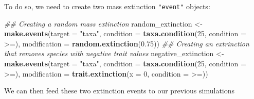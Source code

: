 \documentclass[
]{book}
\newenvironment{Shaded}{\begin{snugshade}}{\end{snugshade}}
\newcommand{\CommentTok}[1]{\textcolor[rgb]{0.56,0.35,0.01}{\textit{#1}}}
\newcommand{\DataTypeTok}[1]{\textcolor[rgb]{0.13,0.29,0.53}{#1}}
\newcommand{\DecValTok}[1]{\textcolor[rgb]{0.00,0.00,0.81}{#1}}
\newcommand{\FloatTok}[1]{\textcolor[rgb]{0.00,0.00,0.81}{#1}}
\newcommand{\KeywordTok}[1]{\textcolor[rgb]{0.13,0.29,0.53}{\textbf{#1}}}
\newcommand{\NormalTok}[1]{#1}
\newcommand{\StringTok}[1]{\textcolor[rgb]{0.31,0.60,0.02}{#1}}
\begin{document}
To do so, we need to create two mass extinction \texttt{"event"} objects:

\begin{Shaded}
\begin{Highlighting}[]
\CommentTok{\#\# Creating a random mass extinction}
\NormalTok{random\_extinction \textless{}{-}}\StringTok{ }\KeywordTok{make.events}\NormalTok{(}\DataTypeTok{target =} \StringTok{"taxa"}\NormalTok{,}
                                 \DataTypeTok{condition =} \KeywordTok{taxa.condition}\NormalTok{(}\DecValTok{25}\NormalTok{, }\DataTypeTok{condition =} \StringTok{\textasciigrave{}}\DataTypeTok{\textgreater{}=}\StringTok{\textasciigrave{}}\NormalTok{),}
                                 \DataTypeTok{modification =} \KeywordTok{random.extinction}\NormalTok{(}\FloatTok{0.75}\NormalTok{))}
\CommentTok{\#\# Creating an extrinction that removes species with negative trait values}
\NormalTok{negative\_extinction \textless{}{-}}\StringTok{ }\KeywordTok{make.events}\NormalTok{(}\DataTypeTok{target =} \StringTok{"taxa"}\NormalTok{,}
                                   \DataTypeTok{condition =} \KeywordTok{taxa.condition}\NormalTok{(}\DecValTok{25}\NormalTok{, }\DataTypeTok{condition =} \StringTok{\textasciigrave{}}\DataTypeTok{\textgreater{}=}\StringTok{\textasciigrave{}}\NormalTok{),}
                                   \DataTypeTok{modification =} \KeywordTok{trait.extinction}\NormalTok{(}\DataTypeTok{x =} \DecValTok{0}\NormalTok{, }\DataTypeTok{condition =} \StringTok{\textasciigrave{}}\DataTypeTok{\textgreater{}=}\StringTok{\textasciigrave{}}\NormalTok{))}
\end{Highlighting}
\end{Shaded}

We can then feed these two extinction events to our previous simulations
\end{document}
